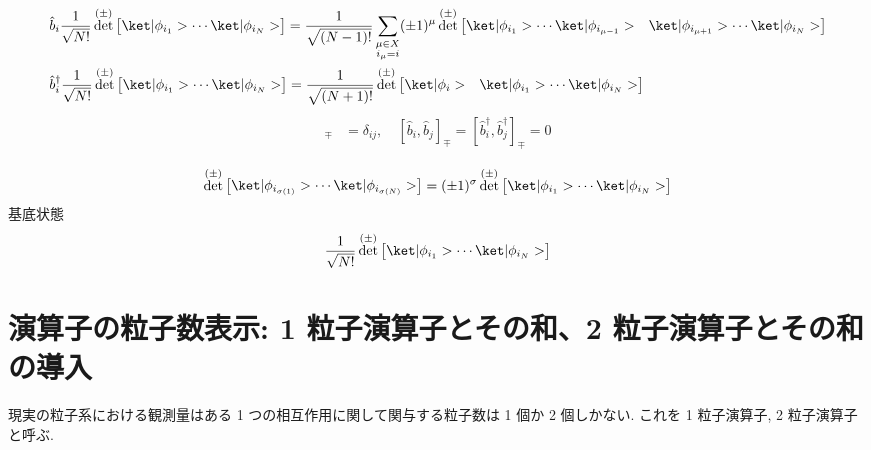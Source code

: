 \documentclass[uplatex,dvipdfmx,a4paper,11pt]{jlreq}
\DeclareMathOperator{\Det}{det}
\numberwithin{equation}{section}
\theoremstyle{definition}
\begin{document}
\begin{theorem}
  \begin{align}
     & \hat{b}_i\frac{1}{\sqrt{N!}}\Det^{(\pm)}\begin{bmatrix}\ket|\phi_{i_1}> \cdots \ket|\phi_{i_N}>\end{bmatrix} = \frac{1}{\sqrt{(N-1)!}}\sum_{\substack{\mu\in X                                                                                \\ i_\mu = i}}(\pm1)^\mu\Det^{(\pm)}\begin{bmatrix}\ket|\phi_{i_1}> \cdots \ket|\phi_{i_{\mu-1}}> & \ket|\phi_{i_{\mu+1}}>\cdots\ket|\phi_{i_N}>\end{bmatrix} \\
     & \hat{b}_i^\dagger\frac{1}{\sqrt{N!}}\Det^{(\pm)}\begin{bmatrix}\ket|\phi_{i_1}> \cdots \ket|\phi_{i_N}>\end{bmatrix} = \frac{1}{\sqrt{(N+1)!}}\Det^{(\pm)}\begin{bmatrix}\ket|\phi_i> & \ket|\phi_{i_1}> \cdots \ket|\phi_{i_N}>\end{bmatrix}
  \end{align}
  \begin{align}
    [\hat{b}_i, \hat{b}_j^\dagger]_\mp & = \delta_{ij}, \quad [\hat{b}_i, \hat{b}_j]_\mp = [\hat{b}_i^\dagger, \hat{b}_j^\dagger]_\mp = 0 \\
  \end{align}
  \begin{align}
    \Det^{(\pm)}\begin{bmatrix}\ket|\phi_{i_{\sigma(1)}}> \cdots \ket|\phi_{i_{\sigma(N)}}>\end{bmatrix} = (\pm 1)^\sigma\Det^{(\pm)}\begin{bmatrix}\ket|\phi_{i_1}> \cdots \ket|\phi_{i_N}>\end{bmatrix}
  \end{align}
  基底状態
  \begin{align}
    \frac{1}{\sqrt{N!}}\Det^{(\pm)}\begin{bmatrix}\ket|\phi_{i_1}>\cdots\ket|\phi_{i_N}>\end{bmatrix}
  \end{align}
\end{theorem}

\section{演算子の粒子数表示: 1 粒子演算子とその和、2 粒子演算子とその和の導入}
現実の粒子系における観測量はある 1 つの相互作用に関して関与する粒子数は 1 個か 2 個しかない. これを 1 粒子演算子, 2 粒子演算子と呼ぶ.
\end{document}
